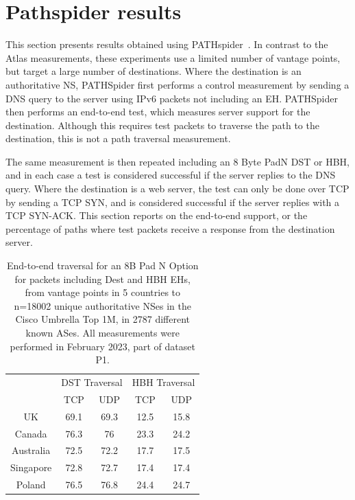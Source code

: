 \documentclass[conference]{IEEEtran}
\begin{document}
\section{Pathspider results} 
\label{sec:pathspider-results}

This section presents results obtained using PATHspider~\cite{learmonth2016pathspider}. In contrast to the Atlas measurements, these experiments use a limited number of vantage points, but target a large number of destinations. Where the destination is an authoritative NS, PATHSpider first performs a control measurement by sending a DNS query to the server using IPv6 packets not including an EH.
PATHSpider then performs an end-to-end test, which measures server support for the destination. Although this requires test packets to traverse the path to the destination, this is not a path traversal measurement.

The same measurement is then repeated including an 8 Byte PadN DST or HBH, and in each case a test is considered successful if the server replies to the DNS query. Where the destination is a web server, the test can only be done over TCP by sending a TCP SYN, and is considered successful if the server replies with a TCP SYN-ACK.
This section reports on the end-to-end support, or the percentage of paths where test packets receive a response from the destination server.

\begin{table} 
\begin{tabular}{c|cc|cc}
\multicolumn{1}{l|}{} & \multicolumn{2}{c|}{DST Traversal} & \multicolumn{2}{c}{HBH Traversal} \\ \cline{2-5} 
\multicolumn{1}{l|}{} & \multicolumn{1}{c|}{TCP}       & UDP      & \multicolumn{1}{c|}{TCP}     & UDP     \\ \hline
UK                    & \multicolumn{1}{c|}{69.1}      & 69.3    & \multicolumn{1}{c|}{12.5}    & 15.8  \\ \hline
Canada                & \multicolumn{1}{c|}{76.3}      & 76     & \multicolumn{1}{c|}{23.3}    & 24.2  \\ \hline
Australia             & \multicolumn{1}{c|}{72.5}        & 72.2      & \multicolumn{1}{c|}{17.7}    & 17.5  \\ \hline
Singapore             & \multicolumn{1}{c|}{72.8}      & 72.7    & \multicolumn{1}{c|}{17.4}    & 17.4   \\ \hline
Poland                & \multicolumn{1}{c|}{76.5}      & 76.8   & \multicolumn{1}{c|}{24.4}    & 24.7   
\end{tabular}
\label{tbl:e2e_traversal}
\caption{End-to-end traversal for an 8B Pad N Option for packets including Dest and HBH EHs, from vantage points in 5 countries to n=18002 unique authoritative NSes in the Cisco Umbrella Top 1M, in 2787 different known ASes. All measurements were performed in February 2023, part of dataset P1. }
\end{table}
\end{document}
